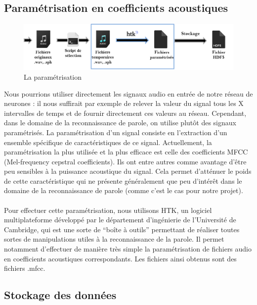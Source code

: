 \documentclass{article}
\begin{document}
\subsection{Paramétrisation en coefficients acoustiques}

\hphantom{.}
\begin{figure}[h]
  \centerline{\includegraphics[scale=0.9]{img/schema_parametrisation.png}}
  \caption{La paramétrisation}
\end{figure}
\newpage

Nous pourrions utiliser directement les signaux audio en entrée de notre réseau de neurones : il nous suffirait par exemple de relever la valeur du signal tous les X intervalles de temps et de fournir directement ces valeurs au réseau. Cependant, dans le domaine de la reconnaissance de parole, on utilise plutôt des signaux paramétrisés.
La paramétrisation d'un signal consiste en l'extraction d'un ensemble spécifique de caractéristiques de ce signal. Actuellement, la paramétrisation la plus utilisée et la plus efficace est celle des coefficients MFCC\cite{haton2006} (Mel-frequency cepstral coefficients). Ils ont entre autres comme avantage d'être peu sensibles à la puissance acoustique du signal. Cela permet d'atténuer le poids de cette caractéristique qui ne présente généralement que peu d'intérêt dans le domaine de la reconnaissance de parole (comme c'est le cas pour notre projet).\\
\\
Pour effectuer cette paramétrisation, nous utilisons HTK\cite{docHTK}, un logiciel multiplateforme développé par le département d'ingénierie de l'Université de Cambridge, qui est une sorte de ``boîte à outils'' permettant de réaliser toutes sortes de manipulations utiles à la reconnaissance de la parole. Il permet notamment d'effectuer de manière très simple la paramétrisation de fichiers audio en coefficients acoustiques correspondants. Les fichiers ainsi obtenus sont des fichiers .mfcc.
 
\subsection{Stockage des données}
\end{document}
